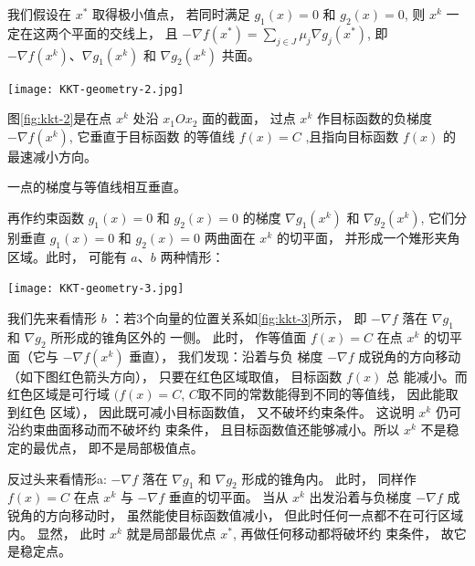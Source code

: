 我们假设在 $ {x}^{*} $ 取得极小值点， 若同时满足 $ g_{1}({x})=0 $ 和 $ g_{2}({x})=0 $, 则 $ {x}^{k} $ 一定在这两个平面的交线上， 且 $ -\nabla f\left({x}^{*}\right)=\sum_{j \in J} \mu_{j} \nabla g_{j}\left({x}^{*}\right) $, 即 $ -\nabla f\left({x}^{k}\right) 、 \nabla g_{1}\left({x}^{k}\right) $ 和 $ \nabla g_{2}\left({x}^{k}\right) $ 共面。

\begin{FigureCenter}{}
    \label{fig:kkt-2}
    \texttt{[image: KKT-geometry-2.jpg]}
\end{FigureCenter}

图\ref{fig:kkt-2}是在点 $ {x}^{k} $ 处沿 $ x_{1} O x_{2} $ 面的截面， 过点 $ {x}^{k} $ 作目标函数的负梯度 $ -\nabla f\left({x}^{k}\right) $, 它垂直于目标函数 的等值线 $ f({x})=C $ ,且指向目标函数 $ f({x}) $ 的最速减小方向。

\begin{corollary}
    一点的梯度与等值线相互垂直。
\end{corollary}

再作约束函数 $ g_{1}({x})=0 $ 和 $ g_{2}({x})=0 $ 的梯度 $ \nabla g_{1}\left({x}^{k}\right) $ 和 $ \nabla g_{2}\left({x}^{k}\right) $, 它们分别垂直 $ g_{1}({x})=0 $ 和 $ g_{2}({x})=0 $ 两曲面在 $ {x}^{k} $ 的切平面， 并形成一个雉形夹角区域。此时， 可能有 $ {a} 、 {b} $ 两种情形：

\begin{FigureCenter}{}
    \label{fig:kkt-3}
    \texttt{[image: KKT-geometry-3.jpg]}
\end{FigureCenter}

我们先来看情形 ${b}$ ：若3个向量的位置关系如\ref{fig:kkt-3}所示， 即 $-\nabla f$ 落在 $\nabla g_{1}$ 和 $\nabla g_{2}$ 所形成的锥角区外的 一侧。 此时， 作等值面 $f({x})=C$ 在点 ${x}^{k}$ 的切平面（它与 $-\nabla f\left({x}^{k}\right)$ 垂直）， 我们发现：沿着与负 梯度 $-\nabla f$ 成锐角的方向移动（如下图红色箭头方向）， 只要在红色区域取值， 目标函数 $f({x})$ 总 能减小。而红色区域是可行域 $(f({x})=C$, $C$取不同的常数能得到不同的等值线， 因此能取到红色 区域）， 因此既可减小目标函数值， 又不破坏约束条件。 这说明 ${x}^{k}$ 仍可沿约束曲面移动而不破坏约 束条件， 且目标函数值还能够减小。所以 ${x}^{k}$ 不是稳定的最优点， 即不是局部极值点。

反过头来看情形a: $ -\nabla f $ 落在 $ \nabla g_{1} $ 和 $ \nabla g_{2} $ 形成的锥角内。 此时， 同样作 $ f({x})=C $ 在点 $ {x}^{k} $ 与 $ -\nabla f $ 垂直的切平面。 当从 $ {x}^{k} $ 出发沿着与负梯度 $ -\nabla f $ 成锐角的方向移动时， 虽然能使目标函数值减小， 但此时任何一点都不在可行区域内。 显然， 此时 $ {x}^{k} $ 就是局部最优点 $ {x}^{*} $, 再做任何移动都将破坏约 束条件， 故它是稳定点。

